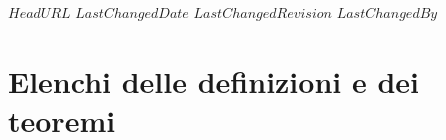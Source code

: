 \svnidlong
{$HeadURL$}
{$LastChangedDate$}
{$LastChangedRevision$}
{$LastChangedBy$}

\chapter{Elenchi delle definizioni e dei teoremi}
\nocite{*}
\begin{multicols}{2}
	\listofdefines
\end{multicols}
\begin{multicols}{2}
	\listoftheoremas
\end{multicols}
\begin{comment}
\end{comment}